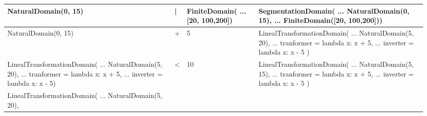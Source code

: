 \begin{longtable}{ | p{6cm} | p{2cm}| p{3.5cm}| p{6.5cm}|  }
    \hline
    NaturalDomain(0, 15)              &
    |                                 &
    FiniteDomain(\newline
    ... [20, 100,200])                &
    SegmentationDomain(\newline
    ... NaturalDomain(0, 15), \newline
    ... FiniteDomain([20, 100,200]))                                                                    \\
    \hline
    NaturalDomain(0, 15)              &
    +                                 &
    5                                 &
    LinealTransformationDomain(\newline
    ... NaturalDomain(5, 20), \newline
    ... tranformer = lambda x: x + 5, \newline
    ... inverter = lambda x: x - 5 )                                                                    \\
    \hline
    LinealTransformationDomain(\newline
    ... NaturalDomain(5, 20),\newline
    ... tranformer = lambda x: x + 5,\newline
    ... inverter = lambda x: x - 5)   &
    <                                 &
    10                                &
    LinealTransformationDomain(\newline
    ... NaturalDomain(5, 15),\newline
    ... tranformer = lambda x: x + 5,\newline
    ... inverter = lambda x: x - 5 )                                                                    \\
    \hline
    LinealTransformationDomain(\newline
    ... NaturalDomain(5, 20),\newline

\end{longtable}
